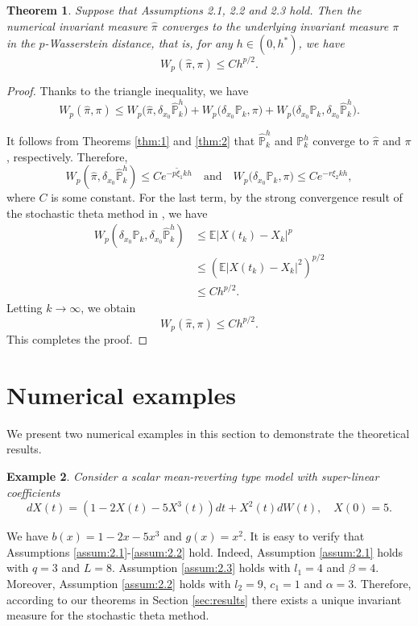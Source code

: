 \documentclass{article}
\newtheorem{theorem}{Theorem}[section]
\newtheorem{example}[theorem]{Example}
\begin{document}
\begin{theorem}\label{thm:3}
Suppose that Assumptions 2.1, 2.2 and 2.3 hold.  Then the numerical invariant measure $\hat{\pi}$ converges to the underlying invariant measure $\pi$ in the $p$-Wasserstein distance, that is, for any $h \in (0, h^*)$, we have
\[
W_p(\hat{\pi}, \pi) \leq Ch^{p/2}.
\]
\end{theorem}
\begin{proof}
Thanks to the triangle inequality, we have
\[
W_p(\hat{\pi}, \pi) 
\leq W_p\bigl(\hat{\pi}, \delta_{x_0} \hat{\mathbb{P}}_k^h)
+ W_p\bigl(\delta_{x_0} \mathbb{P}_{k}, \pi\bigr) 
+ W_p\bigl(\delta_{x_0} \mathbb{P}_{k}, \delta_{x_0} \hat{\mathbb{P}}_{k}^h\bigr).
\]

It follows from Theorems \ref{thm:1} and \ref{thm:2} that $\hat{\mathbb{P}}_{k}^h$ and $\mathbb{P}_{k}^h$ converge to $\hat{\pi}$ and $\pi$, respectively. Therefore,
\[
W_p(\hat{\pi}, \delta_{x_0} \hat{\mathbb{P}}_k^h) \leq C e^{-p \tilde{\xi}_1 k h} \quad \text{and} \quad
W_p\bigl(\delta_{x_0} \mathbb{P}_{k}, \pi\bigr) 
\leq C e^{-r\xi_2 kh},
\]
where $C$ is some constant. 
For the last term, by the strong convergence result of the stochastic theta method in \cite{WangWuDong2020}, we have
\begin{align*}
	W_p(\delta_{x_0}\mathbb{P}_k,\delta_{x_0}\hat{\mathbb{P}}_k^h)
	&\leq \mathbb{E}|X(t_k)-{X}_k|^p  \\
	&\leq \left(\mathbb{E}|X(t_k)-{X}_k|^2\right)^{p/2} \\
	&\leq Ch^{p/2}.
\end{align*}
Letting $k\to\infty$, we obtain
\begin{equation*}
	W_p(\hat{\pi},\pi)\leq Ch^{p/2}.
\end{equation*}
This completes the proof.
\end{proof}

\section{Numerical examples}\label{sec:numexp}
We present two numerical examples in this section to demonstrate the theoretical
results.
\begin{example}\label{Ex1}
Consider a scalar mean-reverting type model with super-linear coefficients
\begin{equation*}
	dX(t)=(1-2X(t)-5X^3(t))dt+X^2(t)dW(t), \quad X(0)=5.
\end{equation*}
\end{example}
We have $b(x)=1-2x-5x^3$ and $g(x)=x^2$. It is easy to verify that Assumptions \ref{assum:2.1}-\ref{assum:2.2} hold. Indeed, Assumption \ref{assum:2.1} holds with $q=3$ and $L=8$. Assumption \ref{assum:2.3} holds with $l_1=4$ and $\beta=4$. Moreover, Assumption \ref{assum:2.2} holds with $l_2=9$, $c_1=1$ and $\alpha=3$. Therefore, according
to our theorems in Section \ref{sec:results} there exists a unique invariant measure for the stochastic theta method.
\end{document}
